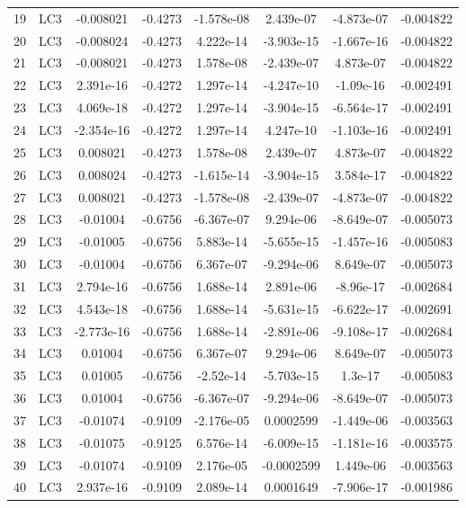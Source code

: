 \documentclass{article}%
\begin{document}
\begin{longtable}{| c c | c c c c c c |}
19&LC3&{-}0.008021&{-}0.4273&{-}1.578e{-}08&2.439e{-}07&{-}4.873e{-}07&{-}0.004822\\%
20&LC3&{-}0.008024&{-}0.4273&4.222e{-}14&{-}3.903e{-}15&{-}1.667e{-}16&{-}0.004822\\%
21&LC3&{-}0.008021&{-}0.4273&1.578e{-}08&{-}2.439e{-}07&4.873e{-}07&{-}0.004822\\%
22&LC3&2.391e{-}16&{-}0.4272&1.297e{-}14&{-}4.247e{-}10&{-}1.09e{-}16&{-}0.002491\\%
23&LC3&4.069e{-}18&{-}0.4272&1.297e{-}14&{-}3.904e{-}15&{-}6.564e{-}17&{-}0.002491\\%
24&LC3&{-}2.354e{-}16&{-}0.4272&1.297e{-}14&4.247e{-}10&{-}1.103e{-}16&{-}0.002491\\%
25&LC3&0.008021&{-}0.4273&1.578e{-}08&2.439e{-}07&4.873e{-}07&{-}0.004822\\%
26&LC3&0.008024&{-}0.4273&{-}1.615e{-}14&{-}3.904e{-}15&3.584e{-}17&{-}0.004822\\%
27&LC3&0.008021&{-}0.4273&{-}1.578e{-}08&{-}2.439e{-}07&{-}4.873e{-}07&{-}0.004822\\%
28&LC3&{-}0.01004&{-}0.6756&{-}6.367e{-}07&9.294e{-}06&{-}8.649e{-}07&{-}0.005073\\%
29&LC3&{-}0.01005&{-}0.6756&5.883e{-}14&{-}5.655e{-}15&{-}1.457e{-}16&{-}0.005083\\%
30&LC3&{-}0.01004&{-}0.6756&6.367e{-}07&{-}9.294e{-}06&8.649e{-}07&{-}0.005073\\%
31&LC3&2.794e{-}16&{-}0.6756&1.688e{-}14&2.891e{-}06&{-}8.96e{-}17&{-}0.002684\\%
32&LC3&4.543e{-}18&{-}0.6756&1.688e{-}14&{-}5.631e{-}15&{-}6.622e{-}17&{-}0.002691\\%
33&LC3&{-}2.773e{-}16&{-}0.6756&1.688e{-}14&{-}2.891e{-}06&{-}9.108e{-}17&{-}0.002684\\%
34&LC3&0.01004&{-}0.6756&6.367e{-}07&9.294e{-}06&8.649e{-}07&{-}0.005073\\%
35&LC3&0.01005&{-}0.6756&{-}2.52e{-}14&{-}5.703e{-}15&1.3e{-}17&{-}0.005083\\%
36&LC3&0.01004&{-}0.6756&{-}6.367e{-}07&{-}9.294e{-}06&{-}8.649e{-}07&{-}0.005073\\%
37&LC3&{-}0.01074&{-}0.9109&{-}2.176e{-}05&0.0002599&{-}1.449e{-}06&{-}0.003563\\%
38&LC3&{-}0.01075&{-}0.9125&6.576e{-}14&{-}6.009e{-}15&{-}1.181e{-}16&{-}0.003575\\%
39&LC3&{-}0.01074&{-}0.9109&2.176e{-}05&{-}0.0002599&1.449e{-}06&{-}0.003563\\%
40&LC3&2.937e{-}16&{-}0.9109&2.089e{-}14&0.0001649&{-}7.906e{-}17&{-}0.001986\\%

\end{longtable}
\end{document}
